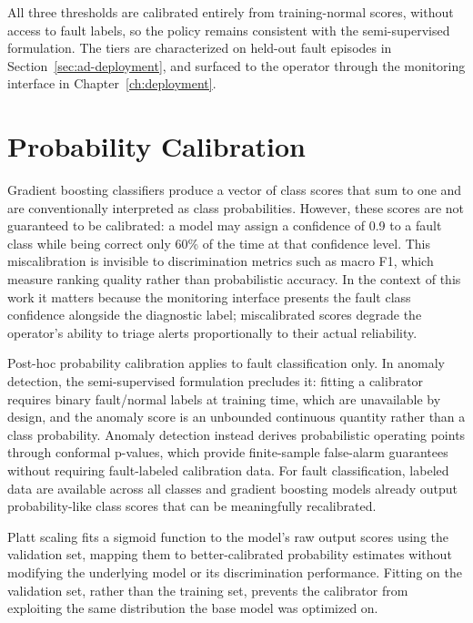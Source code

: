 All three thresholds are calibrated entirely from training-normal scores, without access to fault labels, so the policy remains consistent with the semi-supervised formulation. The tiers are characterized on held-out fault episodes in Section~\ref{sec:ad-deployment}, and surfaced to the operator through the monitoring interface in Chapter~\ref{ch:deployment}.


\section{Probability Calibration}\label{sec:prob-calibration}

Gradient boosting classifiers produce a vector of class scores that sum to one and are conventionally interpreted as class probabilities. However, these scores are not guaranteed to be calibrated: a model may assign a confidence of 0.9 to a fault class while being correct only 60\% of the time at that confidence level. This miscalibration is invisible to discrimination metrics such as macro F1, which measure ranking quality rather than probabilistic accuracy. In the context of this work it matters because the monitoring interface presents the fault class confidence alongside the diagnostic label; miscalibrated scores degrade the operator's ability to triage alerts proportionally to their actual reliability.

Post-hoc probability calibration applies to fault classification only. In anomaly detection, the semi-supervised formulation precludes it: fitting a calibrator requires binary fault/normal labels at training time, which are unavailable by design, and the anomaly score is an unbounded continuous quantity rather than a class probability. Anomaly detection instead derives probabilistic operating points through conformal p-values, which provide finite-sample false-alarm guarantees without requiring fault-labeled calibration data. For fault classification, labeled data are available across all classes and gradient boosting models already output probability-like class scores that can be meaningfully recalibrated.

Platt scaling \citep{platt1999probabilistic} fits a sigmoid function to the model's raw output scores using the validation set, mapping them to better-calibrated probability estimates without modifying the underlying model or its discrimination performance. Fitting on the validation set, rather than the training set, prevents the calibrator from exploiting the same distribution the base model was optimized on.

